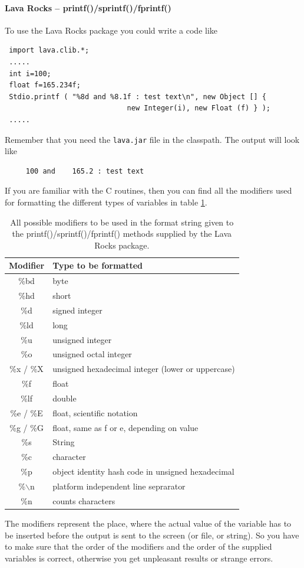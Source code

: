 \paragraph{Lava Rocks -- printf()/sprintf()/fprintf()}
To use the Lava Rocks package you could write a code like
\begin{small}
\begin{verbatim}
 import lava.clib.*;
 .....
 int i=100;
 float f=165.234f;
 Stdio.printf ( "%8d and %8.1f : test text\n", new Object [] { 
                             new Integer(i), new Float (f) } );
 .....                 
\end{verbatim}
\end{small}
Remember that you need the \verb|lava.jar| file in the classpath.
The output will look like
\begin{verbatim}
     100 and    165.2 : test text
\end{verbatim}
If you are familiar with the C routines, then you can find all
the modifiers used for formatting the different types of variables
in table \ref{tab:PrintfModifiers}.
\begin{table}[htbp]
  \begin{center}
    \begin{tabular}{cl}
      Modifier & Type to be formatted \\ \hline
      \%bd & byte \\
      \%hd & short \\
      \%d & signed integer \\
      \%ld & long \\
      \%u & unsigned integer \\
      \%o & unsigned octal integer \\
      \%x / \%X & unsigned hexadecimal integer (lower or uppercase)\\
      \%f & float \\
      \%lf & double \\
      \%e / \%E & float, scientific notation \\
      \%g / \%G & float, same as f or e, depending on value \\
      \%s & String \\
      \%c & character\\
      \%p & object identity hash code in unsigned hexadecimal \\
      \%$\backslash$n & platform independent line seprarator\\
      \%n & counts characters\\
    \end{tabular}
    \caption{All possible modifiers to be used in the format 
      string given to the printf()/sprintf()/fprintf() methods supplied 
      by the Lava Rocks package.}
    \label{tab:PrintfModifiers}
  \end{center}
\end{table}
The modifiers represent the place, where the actual value of the variable 
has to be inserted before the output is sent to the screen (or file, 
or string). So you have to make sure that the order of the modifiers and
the order of the supplied variables is correct, otherwise you get
unpleasant results or strange errors.

